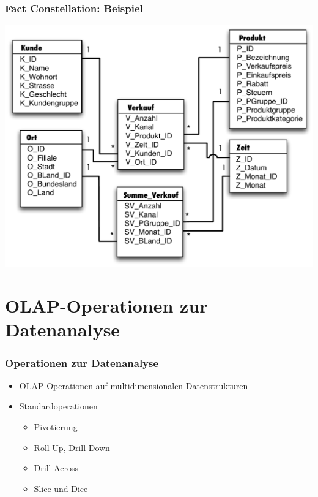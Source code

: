         
        
        
                \begin{frame}
        
                \frametitle{Fact Constellation: Beispiel}
        
                \begin{center}
                  \includegraphics[height=\textAreaHeight]{fig6/Fact-Constellation-Schema.pdf}
                \end{center}
        
        
                \end{frame}
        
        
        \section{OLAP-Operationen zur Datenanalyse}
        
        
        
        \begin{frame}
        
        \frametitle{Operationen zur Datenanalyse}
        \begin{itemize}
        \item OLAP-Operationen auf multidimensionalen Datenstrukturen
        \item Standardoperationen
          \begin{itemize}
          \item Pivotierung
          \item Roll-Up, Drill-Down
          \item Drill-Across
          \item Slice und Dice
          \end{itemize}
        \end{itemize}
        
        
        \end{frame}
        
